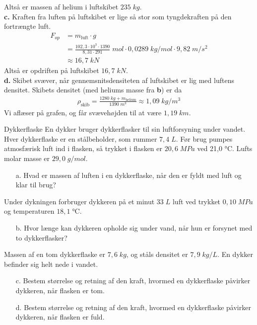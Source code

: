 \documentclass{report}
\begin{document}
Altså er massen af helium i luftskibet $235 \;\unit{kg} $.\\[1ex]
\textbf{c.}
Kraften fra luften på luftskibet er lige så stor som tyngdekraften på den fortrængte luft.
\begin{equation*}
\begin{split}
  F_{op}&=m_{\text{luft} }\cdot g\\ 
  &=\frac{102,3\cdot 10^3  \cdot 1390 }{{8,31 }\cdot 291 }\;\unit{mol} \cdot 0,0289 \;\unit{kg/mol} \cdot 9,82 \;\unit{m/s^2} \\ 
  &\approx 16,7 \;\unit{kN}
\end{split}
\end{equation*}
Altså er opdriften på luftskibet $16,7 \;\unit{kN} $.\\[1ex]
\textbf{d.}
Skibet svæver, når gennemsnitsdensiteten af luftskibet er lig med luftens densitet.
Skibets densitet (med heliums masse fra \textbf{b}) er da
\begin{equation*}
\begin{split}
  \rho_{\text{skib} }=\frac{1280 \;\unit{kg} +m_{\text{helium} }}{1390 \;\unit{m^3} } \approx 1,09 \;\unit{kg/m^3} 
\end{split}
\end{equation*}
Vi aflæser på grafen, og får svævehøjden til at være $1,19\;\unit{km}$.
\begin{question}{Dykkerflaske}{}
 En dykker bruger dykkerflasker til sin luftforsyning under vandet.
Hver dykkerflaske er en stålbeholder, som rummer $7,4 \;\unit{ L}$.
Før brug pumpes atmosfærisk luft ind i flasken, så trykket i flasken er $20,6 \;\unit{ MPa}$ ved 21,0 °C.
  Lufts molar masse er $29,0 \;\unit{ g/mol}$.  
\begin{itemize}
  \item[a.] Hvad er massen af luften i en dykkerflaske, når den er fyldt med luft og klar til brug?
\end{itemize}
Under dykningen forbruger dykkeren på et minut $33 \;\unit{ L}$ luft ved trykket $0,10 \;\unit{ MPa}$ og temperaturen $18,1 \;\unit{\celsius} $.
\begin{itemize}
  \item[b.] Hvor længe kan dykkeren opholde sig under vand, når hun er forsynet med to dykkerflasker?
\end{itemize}
Massen af en tom dykkerflaske er $7,6 \;\unit{ kg}$, og ståls densitet er $7,9 \;\unit{ kg/L}$. En dykker befinder sig helt nede i vandet.
\begin{itemize}
  \item[c.] Bestem størrelse og retning af den kraft, hvormed en dykkerflaske påvirker dykkeren, når flasken er tom.
  \item[d.] Bestem størrelse og retning af den kraft, hvormed en dykkerflaske påvirker dykkeren, når flasken er fuld.
\end{itemize}
\end{question}
\end{document}
